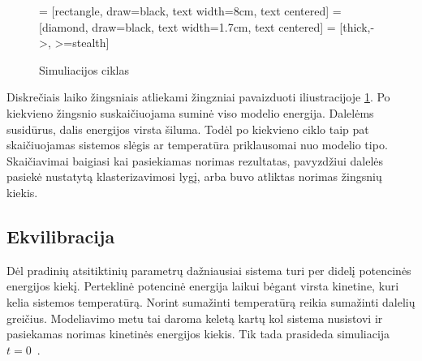 \begin{figure}
\centering

\usetikzlibrary{shapes.geometric, arrows, arrows.meta, positioning, calc}
 = [rectangle, draw=black, text width=8cm, text centered]
 = [diamond, draw=black, text width=1.7cm, text centered]
 = [thick,->, >=stealth]


\caption[Simuliacijos ciklas] {Simuliacijos ciklas}
\label{fig:steps}
\end{figure}

Diskrečiais laiko žingsniais atliekami žingzniai pavaizduoti iliustracijoje \ref{fig:steps}.
Po kiekvieno žingsnio suskaičiuojama suminė viso modelio energija.
Dalelėms susidūrus, dalis energijos virsta šiluma.
Todėl po kiekvieno ciklo taip pat skaičiuojamas sistemos slėgis ar temperatūra priklausomai nuo modelio tipo.
Skaičiavimai baigiasi kai pasiekiamas norimas rezultatas, pavyzdžiui dalelės pasiekė nustatytą klasterizavimosi lygį,
arba buvo atliktas norimas žingsnių kiekis.


\subsection{Ekvilibracija}
\label{sec:equilibration}
Dėl pradinių atsitiktinių parametrų dažniausiai sistema turi per didelį potencinės energijos kiekį.
Perteklinė potencinė energija laikui bėgant virsta kinetine, kuri kelia sistemos temperatūrą.
Norint sumažinti temperatūrą reikia sumažinti dalelių greičius.
Modeliavimo metu tai daroma keletą kartų kol sistema nusistovi ir pasiekamas norimas kinetinės energijos kiekis.
Tik tada prasideda simuliacija \(t = 0\)~\cite{ref_hitch}.


